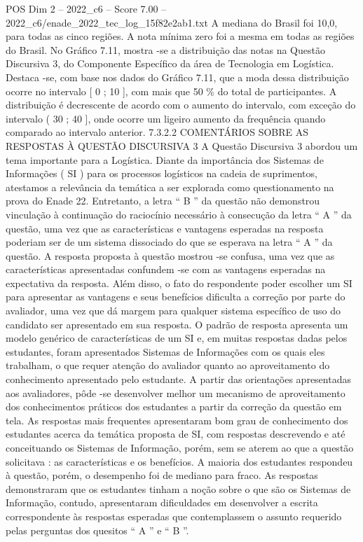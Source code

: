 \begin{textsample}{POS Dim 2 – 2022\_c6 – Score 7.00 – 2022\_c6/enade\_2022\_tec\_log\_15f82e2ab1.txt}
A mediana do Brasil foi 10,0, para todas as cinco regiões.
A nota mínima zero foi a mesma em todas as regiões do Brasil.
No Gráfico 7.11, mostra -se a distribuição das notas na Questão Discursiva 3, do Componente Específico da área de Tecnologia em Logística.
Destaca -se, com base nos dados do Gráfico 7.11, que a moda dessa distribuição ocorre no intervalo [ 0 ; 10 ], com mais que 50 \% do total de participantes.
A distribuição é decrescente de acordo com o aumento do intervalo, com exceção do intervalo ( 30 ; 40 ], onde ocorre um ligeiro aumento da frequência quando comparado ao intervalo anterior. 7.3.2.2 COMENTÁRIOS SOBRE AS RESPOSTAS À QUESTÃO DISCURSIVA 3 A Questão Discursiva 3 abordou um tema importante para a Logística.
Diante da importância dos Sistemas de Informações ( SI ) para os processos logísticos na cadeia de suprimentos, atestamos a relevância da temática a ser explorada como questionamento na prova do Enade 22.
Entretanto, a letra “ B ” da questão não demonstrou vinculação à continuação do raciocínio necessário à consecução da letra “ A ” da questão, uma vez que as características e vantagens esperadas na resposta poderiam ser de um sistema dissociado do que se esperava na letra “ A ” da questão.
A resposta proposta à questão mostrou -se confusa, uma vez que as características apresentadas confundem -se com as vantagens esperadas na expectativa da resposta.
Além disso, o fato do respondente poder escolher um SI para apresentar as vantagens e seus benefícios dificulta a correção por parte do avaliador, uma vez que dá margem para qualquer sistema específico de uso do candidato ser apresentado em sua resposta.
O padrão de resposta apresenta um modelo genérico de características de um SI e, em muitas respostas dadas pelos estudantes, foram apresentados Sistemas de Informações com os quais eles trabalham, o que requer atenção do avaliador quanto ao aproveitamento do conhecimento apresentado pelo estudante.
A partir das orientações apresentadas aos avaliadores, pôde -se desenvolver melhor um mecanismo de aproveitamento dos conhecimentos práticos dos estudantes a partir da correção da questão em tela.
As respostas mais frequentes apresentaram bom grau de conhecimento dos estudantes acerca da temática proposta de SI, com respostas descrevendo e até conceituando os Sistemas de Informação, porém, sem se aterem ao que a questão solicitava : as características e os benefícios.
A maioria dos estudantes respondeu à questão, porém, o desempenho foi de mediano para fraco.
As respostas demonstraram que os estudantes tinham a noção sobre o que são os Sistemas de Informação, contudo, apresentaram dificuldades em desenvolver a escrita correspondente às respostas esperadas que contemplassem o assunto requerido pelas perguntas dos quesitos “ A ” e “ B ”.

\end{textsample}
